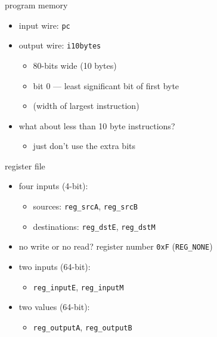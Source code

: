 
\begin{frame}{program memory}
    \begin{itemize}
    \item input wire: {\tt pc} 
    \item output wire: {\tt i10bytes} 
        \begin{itemize}
        \item 80-bits wide (10 bytes)
        \item bit 0 --- least significant bit of first byte
        \item (width of largest instruction)
        \end{itemize}
    \vspace{.5cm}
    \item<2> what about less than 10 byte instructions?
        \begin{itemize}
        \item just don't use the extra bits
        \end{itemize}
    \end{itemize}
\end{frame}


\begin{frame}{register file}
    \begin{itemize}
    \item four  inputs (4-bit): 
        \begin{itemize}
        \item sources: {\tt reg\_srcA}, {\tt reg\_srcB}
        \item destinations: {\tt reg\_dstE}, {\tt reg\_dstM}
        \end{itemize}
    \item no write or no read? register number {\tt 0xF} ({\tt REG\_NONE})
    \item two  inputs (64-bit):
        \begin{itemize}
        \item {\tt reg\_inputE}, {\tt reg\_inputM}
        \end{itemize}
    \item two  values (64-bit):
        \begin{itemize}
        \item {\tt reg\_outputA}, {\tt reg\_outputB}
        \end{itemize}
    \end{itemize}
\end{frame}

